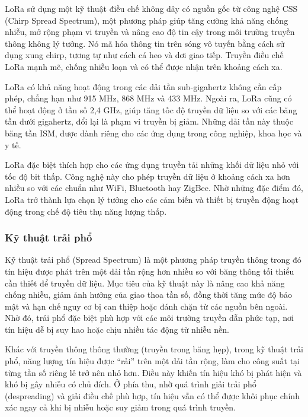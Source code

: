 \documentclass{article}
\begin{document}
	LoRa sử dụng một kỹ thuật điều chế không dây có nguồn gốc từ công
	nghệ CSS (Chirp Spread Spectrum), một phương pháp giúp tăng cường khả năng chống nhiễu, mở rộng phạm vi truyền và nâng cao độ tin cậy trong môi trường truyền thông không lý tưởng. Nó mã hóa thông tin trên sóng vô tuyến bằng cách sử dụng xung chirp, tương tự như cách cá heo và dơi giao tiếp. Truyền điều chế LoRa mạnh mẽ, chống nhiễu loạn và có thể được nhận trên khoảng cách xa.
	
	LoRa có khả năng hoạt động trong các dải tần sub-gigahertz không cần cấp phép, chẳng hạn như 915 MHz, 868 MHz và 433 MHz. Ngoài ra, LoRa cũng có thể hoạt động ở tần số 2,4 GHz, giúp tăng tốc độ truyền dữ liệu so với các băng tần dưới gigahertz, đổi lại là phạm vi truyền bị giảm. Những dải tần này thuộc băng tần ISM, được dành riêng cho các ứng dụng trong công nghiệp, khoa học và y tế.
	
	LoRa đặc biệt thích hợp cho các ứng dụng truyền tải những khối dữ liệu nhỏ với tốc độ bit thấp. Công nghệ này cho phép truyền dữ liệu ở khoảng cách xa hơn nhiều so với các chuẩn như WiFi, Bluetooth hay ZigBee. Nhờ những đặc điểm đó, LoRa trở thành lựa chọn lý tưởng cho các cảm biến và thiết bị truyền động hoạt động trong chế độ tiêu thụ năng lượng thấp.
	
	\subsubsection{Kỹ thuật trải phổ}
	
	Kỹ thuật trải phổ (Spread Spectrum) là một phương pháp truyền thông trong đó tín hiệu được phát trên một dải tần rộng hơn nhiều so với băng thông tối thiểu cần thiết để truyền dữ liệu. Mục tiêu của kỹ thuật này là nâng cao khả năng chống nhiễu, giảm ảnh hưởng của giao thoa tần số, đồng thời tăng mức độ bảo mật và hạn chế nguy cơ bị can thiệp hoặc đánh chặn từ các nguồn bên ngoài. Nhờ đó, trải phổ đặc biệt phù hợp với các môi trường truyền dẫn phức tạp, nơi tín hiệu dễ bị suy hao hoặc chịu nhiều tác động từ nhiễu nền.
	
	Khác với truyền thông thông thường (truyền trong băng hẹp), trong kỹ thuật trải phổ, năng lượng tín hiệu được “rải” trên một dải tần rộng, làm cho công suất tại từng tần số riêng lẻ trở nên nhỏ hơn. Điều này khiến tín hiệu khó bị phát hiện và khó bị gây nhiễu có chủ đích. Ở phía thu, nhờ quá trình giải trải phổ (despreading) và giải điều chế phù hợp, tín hiệu vẫn có thể được khôi phục chính xác ngay cả khi bị nhiễu hoặc suy giảm trong quá trình truyền.
	
\end{document}
